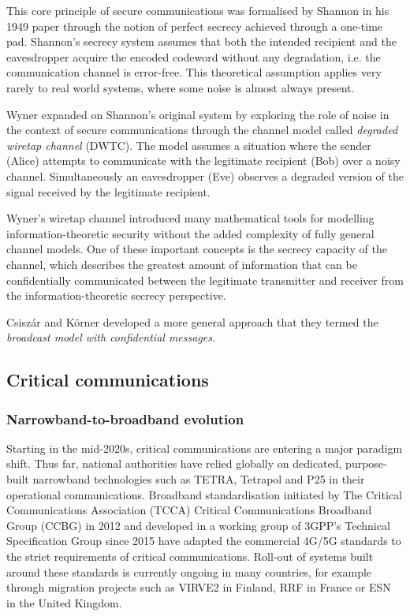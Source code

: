 \documentclass[english, 12pt, a4paper, elec, utf8, a-1b, online]{aaltothesis}
\begin{document}
This core principle of secure communications was formalised by Shannon \cite{shannon1949communication} in his 1949 paper through the notion of perfect secrecy achieved through a one-time pad.
Shannon's secrecy system assumes that both the intended recipient and the eavesdropper acquire the encoded codeword without any degradation, i.e.
the communication channel is error-free.
This theoretical assumption applies very rarely to real world systems, where some noise is almost always present.
\cite{bloch2011physical}

Wyner \cite{wyner1975thewiretap} expanded on Shannon's original system by exploring the role of noise in the context of secure communications through the channel model called \textit{degraded wiretap channel} (DWTC).
The model assumes a situation where the sender (Alice) attempts to communicate with the legitimate recipient (Bob) over a noisy channel.
Simultaneously an eavesdropper (Eve) observes a degraded version of the signal received by the legitimate recipient.
\cite{barros2006secrecy}

Wyner's wiretap channel introduced many mathematical tools for modelling information-theoretic security without the added complexity of fully general channel models.
One of these important concepts is the secrecy capacity of the channel, which describes the greatest amount of information that can be confidentially communicated between the legitimate transmitter and receiver from the information-theoretic secrecy perspective.
\cite{bloch2011physical}

Csiszár and Körner \cite{csiszar1978broadcast} developed a more general approach that they termed the \textit{broadcast model with confidential messages}.

\clearpage

\subsection{Critical communications}
\subsubsection{Narrowband-to-broadband evolution}
Starting in the mid-2020s, critical communications are entering a major paradigm shift. Thus far, national authorities have relied globally on dedicated, purpose-built narrowband technologies such as TETRA, Tetrapol and P25 in their operational communications. Broadband standardisation initiated by The Critical Communications Association (TCCA) Critical Communications Broadband Group (CCBG) in 2012 and developed in a working group of 3GPP’s Technical Specification Group since 2015 have adapted the commercial 4G/5G standards to the strict requirements of critical communications. Roll-out of systems built around these standards is currently ongoing in many countries, for example through migration projects such as VIRVE2 in Finland, RRF in France or ESN in the United Kingdom.
\end{document}
